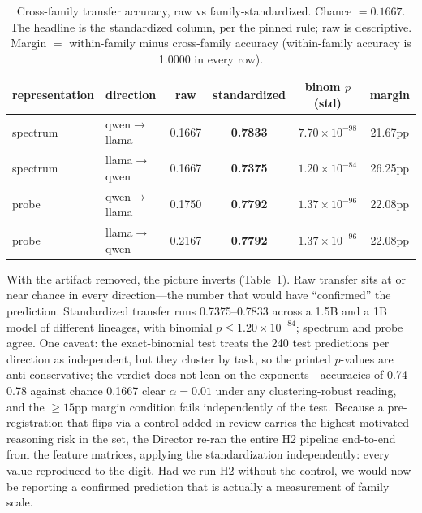 \documentclass[10pt]{article}
\begin{document}
\begin{table}[ht]
\centering
\caption{Cross-family transfer accuracy, raw vs family-standardized.
Chance $= 0.1667$. The headline is the standardized column, per the pinned
rule; raw is descriptive. Margin $=$ within-family minus cross-family
accuracy (within-family accuracy is 1.0000 in every row).}
\label{tab:transfer}
\begin{tabular}{llcccc}
\toprule
representation & direction & raw & standardized & binom $p$ (std) & margin \\
\midrule
spectrum & qwen$\rightarrow$llama & 0.1667 & \textbf{0.7833} & $7.70\times10^{-98}$ & 21.67pp \\
spectrum & llama$\rightarrow$qwen & 0.1667 & \textbf{0.7375} & $1.20\times10^{-84}$ & 26.25pp \\
probe & qwen$\rightarrow$llama & 0.1750 & \textbf{0.7792} & $1.37\times10^{-96}$ & 22.08pp \\
probe & llama$\rightarrow$qwen & 0.2167 & \textbf{0.7792} & $1.37\times10^{-96}$ & 22.08pp \\
\bottomrule
\end{tabular}
\end{table}

With the artifact removed, the picture inverts (Table~\ref{tab:transfer}).
Raw transfer sits at or near chance in every direction---the number that
would have ``confirmed'' the prediction. Standardized transfer runs
0.7375--0.7833 across a 1.5B and a 1B model of different lineages, with
binomial $p \le 1.20\times10^{-84}$; spectrum and probe agree. One caveat:
the exact-binomial test treats the 240 test predictions per direction as
independent, but they cluster by task, so the printed $p$-values are
anti-conservative; the verdict does not lean on the exponents---accuracies
of 0.74--0.78 against chance 0.1667 clear $\alpha = 0.01$ under any
clustering-robust reading, and the $\ge 15$pp margin condition fails
independently of the test. Because a pre-registration that flips via a
control added in review carries the highest motivated-reasoning risk in the
set, the Director re-ran the entire H2 pipeline end-to-end from the feature
matrices, applying the standardization independently: every value
reproduced to the digit. Had we run H2 without the control, we would now be
reporting a confirmed prediction that is actually a measurement of family
scale.
\end{document}
